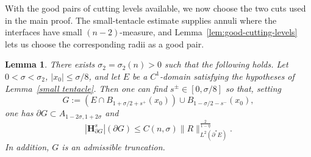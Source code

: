 \documentclass[reqno,11pt]{amsart}
\makeatletter
\def\sz{\sigma}
\newtheorem{lem}[thm]{Lemma}%
\numberwithin{equation}{section}
\theoremstyle{remark}
\makeatother
\begin{document}
With the good pairs of cutting levels available, we now choose the two cuts
used in the main proof. The small-tentacle estimate supplies annuli where the
interfaces have small $(n-2)$-measure, and Lemma~\ref{lem:good-cutting-levels}
lets us choose the corresponding radii as a good pair.

\begin{lem}\label{lem:good truncation}
There exists $\sz_2=\sz_2(n)>0$ such that the following holds.  Let
$0<\sz<\sz_2$, $|x_0|\le\sz/8$, and let $E$ be a $C^1$-domain satisfying the
hypotheses of Lemma~\ref{small tentacle}. Then one can find
$s^\pm\in[0,\sz/8]$ so that, setting
$$
G:=(E\cap B_{1+\sz/2+s^+}(x_0))\cup B_{1-\sz/2-s^-}(x_0),
$$
one has $\partial G\subset A_{1-2\sz,1+2\sz}$ and
\begin{equation}\label{eq:singular-mean}
|\mathbf H^s_{\partial G}|(\partial G)
\le C(n,\sz)\|R\|_{L^2(\partial^*E)}^{\frac{2}{1-\eta}} .
\end{equation}
In addition, $G$ is an admissible truncation.
\end{lem}
\end{document}
